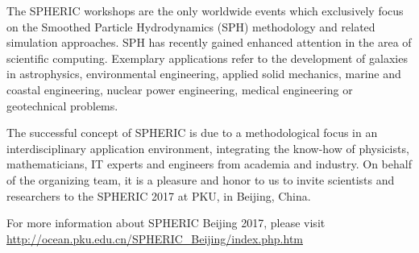 The SPHERIC workshops are the only worldwide events which exclusively focus on the Smoothed Particle Hydrodynamics (SPH) methodology and related simulation approaches. SPH has recently gained enhanced attention in the area of scientific computing. Exemplary applications refer to the development of galaxies in astrophysics, environmental engineering, applied solid mechanics, marine and coastal engineering, nuclear power engineering, medical engineering or geotechnical problems.

The successful concept of SPHERIC is due to a methodological focus in an interdisciplinary application environment, integrating the know-how of physicists, mathematicians, IT experts and engineers from academia and industry. On behalf of the organizing team, it is a pleasure and honor to us to invite scientists and researchers to the SPHERIC 2017 at PKU, in Beijing, China.

For more information about SPHERIC Beijing 2017, please visit \url{http://ocean.pku.edu.cn/SPHERIC_Beijing/index.php.htm}